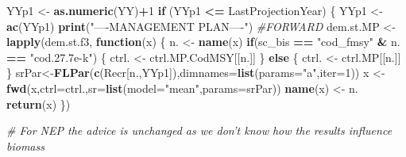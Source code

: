 \documentclass[
]{article}
\newenvironment{Shaded}{\begin{snugshade}}{\end{snugshade}}
\newcommand{\CommentTok}[1]{\textcolor[rgb]{0.56,0.35,0.01}{\textit{#1}}}
\newcommand{\ControlFlowTok}[1]{\textcolor[rgb]{0.13,0.29,0.53}{\textbf{#1}}}
\newcommand{\DataTypeTok}[1]{\textcolor[rgb]{0.13,0.29,0.53}{#1}}
\newcommand{\DecValTok}[1]{\textcolor[rgb]{0.00,0.00,0.81}{#1}}
\newcommand{\KeywordTok}[1]{\textcolor[rgb]{0.13,0.29,0.53}{\textbf{#1}}}
\newcommand{\NormalTok}[1]{#1}
\newcommand{\OperatorTok}[1]{\textcolor[rgb]{0.81,0.36,0.00}{\textbf{#1}}}
\newcommand{\StringTok}[1]{\textcolor[rgb]{0.31,0.60,0.02}{#1}}
\begin{document}
\begin{Shaded}
\begin{Highlighting}[]
{{{{{\NormalTok{            YYp1 <-}\StringTok{ }\KeywordTok{as.numeric}\NormalTok{(YY)}\OperatorTok{+}\DecValTok{1}
            \ControlFlowTok{if}\NormalTok{ (YYp1 }\OperatorTok{<=}\StringTok{ }\NormalTok{LastProjectionYear) \{}
\NormalTok{                YYp1 <-}\StringTok{ }\KeywordTok{ac}\NormalTok{(YYp1)}
                \KeywordTok{print}\NormalTok{(}\StringTok{"----MANAGEMENT PLAN----"}\NormalTok{)}
                \CommentTok{#FORWARD}
\NormalTok{                dem.st.MP <-}\StringTok{ }\KeywordTok{lapply}\NormalTok{(dem.st.f3, }\ControlFlowTok{function}\NormalTok{(x) \{}
\NormalTok{                                n. <-}\StringTok{ }\KeywordTok{name}\NormalTok{(x)}
                                  \ControlFlowTok{if}\NormalTok{(sc_bis }\OperatorTok{==}\StringTok{ "cod_fmsy"} \OperatorTok{&}\StringTok{ }\NormalTok{n. }\OperatorTok{==}\StringTok{ "cod.27.7e-k"}\NormalTok{) \{}
\NormalTok{                                ctrl. <-}\StringTok{ }\NormalTok{ctrl.MP.CodMSY[[n.]]}
\NormalTok{                                \} }\ControlFlowTok{else}\NormalTok{ \{}
\NormalTok{                                  ctrl. <-}\StringTok{ }\NormalTok{ctrl.MP[[n.]] }
\NormalTok{                                \}}
\NormalTok{                                srPar<-}\KeywordTok{FLPar}\NormalTok{(}\KeywordTok{c}\NormalTok{(Recr[n.,YYp1]),}\DataTypeTok{dimnames=}\KeywordTok{list}\NormalTok{(}\DataTypeTok{params=}\StringTok{"a"}\NormalTok{,}\DataTypeTok{iter=}\DecValTok{1}\NormalTok{))}
\NormalTok{                                x <-}\StringTok{ }\KeywordTok{fwd}\NormalTok{(x,}\DataTypeTok{ctrl=}\NormalTok{ctrl.,}\DataTypeTok{sr=}\KeywordTok{list}\NormalTok{(}\DataTypeTok{model=}\StringTok{"mean"}\NormalTok{,}\DataTypeTok{params=}\NormalTok{srPar))}
                                \KeywordTok{name}\NormalTok{(x) <-}\StringTok{ }\NormalTok{n.}
                                \KeywordTok{return}\NormalTok{(x)}
\NormalTok{                                \})}

        \CommentTok{# For NEP the advice is unchanged as we don't know how the results influence biomass}

}}}}}
\end{Highlighting}
\end{Shaded}
\end{document}
